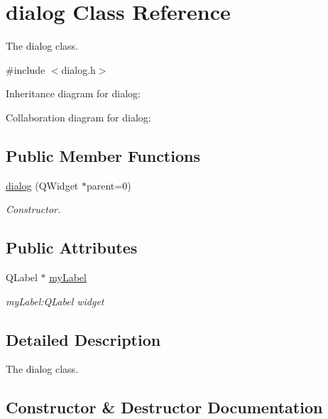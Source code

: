 \hypertarget{classdialog}{}\section{dialog Class Reference}
\label{classdialog}


The dialog class.  




{\ttfamily \#include $<$dialog.\+h$>$}



Inheritance diagram for dialog\+:


Collaboration diagram for dialog\+:
\subsection*{Public Member Functions}
\begin{DoxyCompactItemize}
\item 
\hyperlink{classdialog_aed5e52897cd1d0a032e7303ba59c56bc}{dialog} (Q\+Widget $\ast$parent=0)
\begin{DoxyCompactList}\small\item\em Constructor. \end{DoxyCompactList}\end{DoxyCompactItemize}
\subsection*{Public Attributes}
\begin{DoxyCompactItemize}
\item 
Q\+Label $\ast$ \hyperlink{classdialog_a292466f4a4150441acb4b947f96a2d28}{my\+Label}\hypertarget{classdialog_a292466f4a4150441acb4b947f96a2d28}{}\label{classdialog_a292466f4a4150441acb4b947f96a2d28}

\begin{DoxyCompactList}\small\item\em my\+Label\+:Q\+Label widget \end{DoxyCompactList}\end{DoxyCompactItemize}


\subsection{Detailed Description}
The dialog class. 

\subsection{Constructor \& Destructor Documentation}
